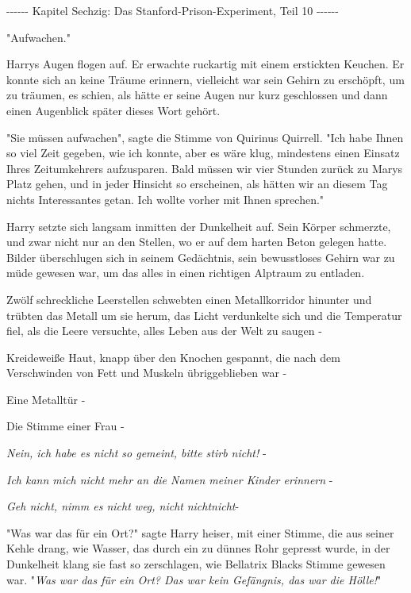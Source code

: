 

\hypertarget{das-stanford-prison-experiment-teil-10}{%

-\/-\/-\/-\/-\/- Kapitel Sechzig: Das Stanford-Prison-Experiment, Teil 10 -\/-\/-\/-\/-\/-

"Aufwachen."

Harrys Augen flogen auf. Er erwachte ruckartig mit einem erstickten Keuchen. Er konnte sich an keine Träume erinnern, vielleicht war sein Gehirn zu erschöpft, um zu träumen, es schien, als hätte er seine Augen nur kurz geschlossen und dann einen Augenblick später dieses Wort gehört.

"Sie müssen aufwachen", sagte die Stimme von Quirinus Quirrell. "Ich habe Ihnen so viel Zeit gegeben, wie ich konnte, aber es wäre klug, mindestens einen Einsatz Ihres Zeitumkehrers aufzusparen. Bald müssen wir vier Stunden zurück zu Marys Platz gehen, und in jeder Hinsicht so erscheinen, als hätten wir an diesem Tag nichts Interessantes getan. Ich wollte vorher mit Ihnen sprechen."

Harry setzte sich langsam inmitten der Dunkelheit auf. Sein Körper schmerzte, und zwar nicht nur an den Stellen, wo er auf dem harten Beton gelegen hatte. Bilder überschlugen sich in seinem Gedächtnis, sein bewusstloses Gehirn war zu müde gewesen war, um das alles in einen richtigen Alptraum zu entladen.

Zwölf schreckliche Leerstellen schwebten einen Metallkorridor hinunter und trübten das Metall um sie herum, das Licht verdunkelte sich und die Temperatur fiel, als die Leere versuchte, alles Leben aus der Welt zu saugen -

Kreideweiße Haut, knapp über den Knochen gespannt, die nach dem Verschwinden von Fett und Muskeln übriggeblieben war -

Eine Metalltür -

Die Stimme einer Frau -

\emph{Nein, ich habe es nicht so gemeint, bitte stirb nicht!} -

\emph{Ich kann mich nicht mehr an die Namen meiner Kinder erinnern} -

\emph{Geh nicht, nimm es nicht weg, nicht} \emph{nichtnicht}-

"Was war das für ein Ort?" sagte Harry heiser, mit einer Stimme, die aus seiner Kehle drang, wie Wasser, das durch ein zu dünnes Rohr gepresst wurde, in der Dunkelheit klang sie fast so zerschlagen, wie Bellatrix Blacks Stimme gewesen war. "\emph{Was war das für ein Ort? Das war kein Gefängnis, das war die Hölle!}"

}
